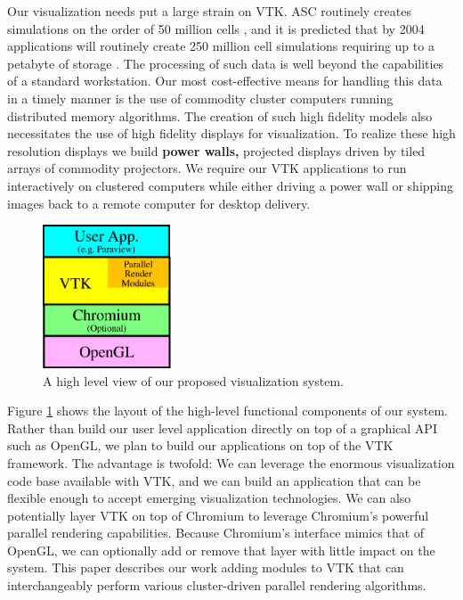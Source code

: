\documentclass{acmsiggraph}
\newcommand{\keyterm}[1]{\textbf{#1}}
\begin{document}
  Our visualization needs put a large strain on VTK.  ASC routinely
  creates simulations on the order of 50 million cells \cite{Heermann99},
  and it is predicted that by 2004 applications will routinely create 250
  million cell simulations requiring up to a petabyte of storage
  \cite{Smith98}.  The processing of such data is well beyond the
  capabilities of a standard workstation.  Our most cost-effective means
  for handling this data in a timely manner is the use of commodity cluster
  computers running distributed memory algorithms.  The creation of such
  high fidelity models also necessitates the use of high fidelity displays
  for visualization.  To realize these high resolution displays we build
  \keyterm{power walls,} projected displays driven by tiled arrays of
  commodity projectors.  We require our VTK applications to run
  interactively on clustered computers while either driving a power wall or
  shipping images back to a remote computer for desktop delivery.

  \begin{figure}
    \center
    \includegraphics[width=1.5in]{images/AppLayers}
    \caption{A high level view of our proposed visualization system.}
    \label{fig:applayers}
  \end{figure}
  Figure \ref{fig:applayers} shows the layout of the high-level functional
  components of our system.  Rather than build our user level application
  directly on top of a graphical API such as OpenGL, we plan to build our
  applications on top of the VTK framework.  The advantage is twofold: We
  can leverage the enormous visualization code base available with VTK, and
  we can build an application that can be flexible enough to accept
  emerging visualization technologies.  We can also potentially layer VTK
  on top of Chromium to leverage Chromium's powerful parallel rendering
  capabilities.  Because Chromium's interface mimics that of OpenGL, we can
  optionally add or remove that layer with little impact on the system.
  This paper describes our work adding modules to VTK that can
  interchangeably perform various cluster-driven parallel rendering
  algorithms.
\end{document}
